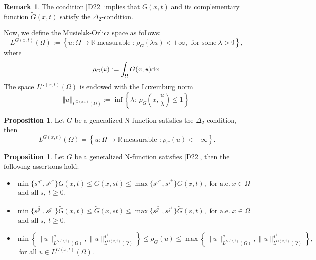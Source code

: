 \documentclass[10pt,reqno]{amsart}
\newcommand *\w{^\wedge}
\theoremstyle{definition}
\newtheorem{proposition}[theorem]{Proposition}
\newtheorem{remark}[theorem]{Remark}
\numberwithin{equation}{section}
\begin{document}
\begin{remark}\label{compl}
The condition \eqref{D22} implies that $G(x,t)$ and its complementary function $\widetilde{G}(x,t)$ satisfy the $\Delta_2$-condition.
\end{remark}
 Now, we  define the Musielak-Orlicz space as follows:
$$L^{G(x,t)}(\Omega):=\left\lbrace u:\Omega\longrightarrow \mathbb{R}\ \text{measurable :}\ \rho_{G}(\lambda u)<+\infty,\ \ \text{for some}\ \lambda>0\right\rbrace,$$
where
\begin{equation}\label{Mo}
  \rho_{G}(u):= \int_{\Omega}G(x, u){\rm d}x.
\end{equation}
The space $L^{G(x,t)}(\Omega)$ is endowed with the Luxemburg norm
\begin{equation}\label{No}
  \Vert u\Vert_{L^{G(x,t)}(\Omega)}:=\inf\left\lbrace \lambda:\ \rho_{G}\left(x,\frac{u}{\lambda}\right)\leq 1\right\rbrace.
\end{equation}
\begin{proposition}\label{HM}
    Let $G$ be a generalized \textnormal{N}-function satisfies the $\Delta_2$-condition, then
    $$L^{G(x,t)}(\Omega) =\left\lbrace  u: \Omega \longrightarrow \mathbb{R}\ \text{measurable :}\ \rho_{G}( u)<+\infty\right\rbrace.$$
\end{proposition}
\begin{proposition} \label{zoo}
     Let $G$ be a generalized \textnormal{N}-function satisfies \eqref{D22}, then the following assertions hold:
     \begin{itemize}
    \item [(1)] $\min \{s^{g^-}, s^{g^+}\}G(x,t)\leq  G(x,s t)\leq \max \{ s^{g^-}, s^{g^+}\}G(x,t),\text{ for a.e. } x \in \Omega$ $\text{ and all }  s, \ t \geq 0. $
     \item [(2)] $\min \{s^{\widetilde{g^-}}, s^{\widetilde{g^+}}\}\widetilde{G}(x,t)\leq  \widetilde{G}(x,s t)\leq \max \{ s^{\widetilde{g^-}}, s^{\widetilde{g^+}}\}\widetilde{G}(x,t),\text{ for a.e. } x \in \Omega$ $\text{ and all }  s, \ t \geq 0. $
 \item [(3)]  $\min \left\{\|u\|_{L^{G(x,t)}(\Omega)}^{g^-},\|u\|_{L^{G(x,t)}(\Omega)}^{g^+}\right\} \leq \rho_{G}(u) \leq\max \left\{\|u\|_{L^{G(x,t)}(\Omega)}^{g^-},\|u\|_{L^{G(x,t)}(\Omega)}^{g^+}\right\},$ \ for all $  u\in L^{G(x,t)}(\Omega)$.
\end{itemize}
\end{proposition}
\end{document}

